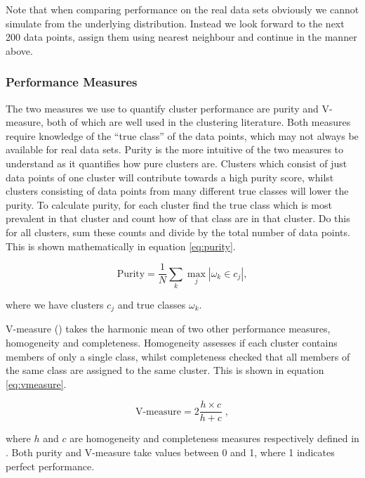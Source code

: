 Note that when comparing performance on the real data sets obviously we cannot simulate from the underlying distribution. Instead we look forward to the next 200 data points, assign them using nearest neighbour and continue in the manner above.

\subsubsection{Performance Measures}

The two measures we use to quantify cluster performance are purity and V-measure, both of which are well used in the clustering literature. Both measures require knowledge of the ``true class'' of the data points, which may not always be available for real data sets. Purity is the more intuitive of the two measures to understand as it quantifies how pure clusters are. Clusters which consist of just data points of one cluster will contribute towards a high purity score, whilst clusters consisting of data points from many different true classes will lower the purity. To calculate purity, for each cluster find the true class which is most prevalent in that cluster and count how of that class are in that cluster. Do this for all clusters, sum these counts and divide by the total number of data points. This is shown mathematically in equation \eqref{eq:purity}.

\begin{equation}
  \label{eq:purity}
  \text{Purity} = \frac{1}{N} \sum_{k}\max_j | \omega_k \in c_j |,
\end{equation}

where we have clusters $c_j$ and true classes $\omega_k$.

 V-measure (\cite{Rosenberg2007}) takes the harmonic mean of two other performance measures, homogeneity and completeness. Homogeneity assesses if each cluster contains members of only a single class, whilst completeness checked that all members of the same class are assigned to the same cluster. This is shown in equation \eqref{eq:vmeasure}. 

\begin{equation}
  \label{eq:vmeasure}
  \text{V-measure} = 2 \frac{h \times c}{h + c} \;,
\end{equation}

where $h$ and $c$ are homogeneity and completeness measures respectively defined in \cite{Rosenberg2007}. Both purity and V-measure take values between 0 and 1, where 1 indicates perfect performance. 


